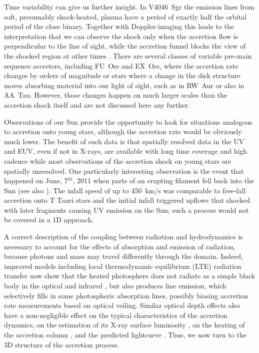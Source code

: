 Time variability can give us further insight. In V4046~Sgr the emission lines from soft, presumably shock-heated, plasma have a period of exactly half the orbital period of the close binary. Together with Doppler-imaging this leads to the interpretation that we can observe the shock only when the accretion flow is perpendicular to the line of sight, while the accretion funnel blocks the view of the shocked region at other times \cite{2012ApJ...752..100A}. 
There are several classes of variable pre-main sequence accretors, including FU~Ors and EX~Ors, where the accretion rate changes by orders of magnitude or stars where a change in the disk structure moves absorbing material into our light of sight, such as in RW~Aur or also in AA~Tau. However, those changes happen on much larger scales than the accretion shock itself and are not discussed here any further.


Observations of our Sun provide the opportunity to look for situations analogous to accretion onto young stars, although the accretion rate would be obviously much lower. The benefit of such data is that spatially resolved data in the UV and EUV, even if not in X-rays, are available with long time coverage and high cadence while most observations of the accretion shock on young stars are spatially unresolved. One particularly interesting observation is the event that happened on June, 7$^{th}$, 2011 when parts of an erupting filament fell back into the Sun \cite{2013Sci...341..251R} (see also \cite{Reale_2014}). The infall speed of up to 450~km/s was comparable to free-fall accretion onto T Tauri stars and the initial infall triggered upflows that shocked with later fragments causing UV emission on the Sun; such a process would not be covered in a 1D approach.



A correct description of the coupling between radiation and hydrodynamics is necessary to account for the effects of absorption and emission of radiation, because photons and mass may travel differently through the domain. Indeed, improved models including local thermodynamic equilibrium (LTE) radiation transfer now show that the heated photosphere does not radiate as a simple black body in the optical and infrared \cite{Dodin_2012,Dodin_2013}, but also produces line emission, which selectively fills in some photospheric absorption lines, possibly biasing accretion rate measurements based on optical veiling.
Similar optical depth effects also
have a non-negligible effect on the typical characteristics of the 
accretion dynamics, on the estimation of its X-ray surface luminosity 
\cite{Sa_2019}, on the heating of the accretion column \cite{1999AstL...25..430L,Costa_2017}, and the predicted lightcurve \cite{2021ApJ...908...16R}. Thus, we now turn to the 3D structure of the accretion process.


